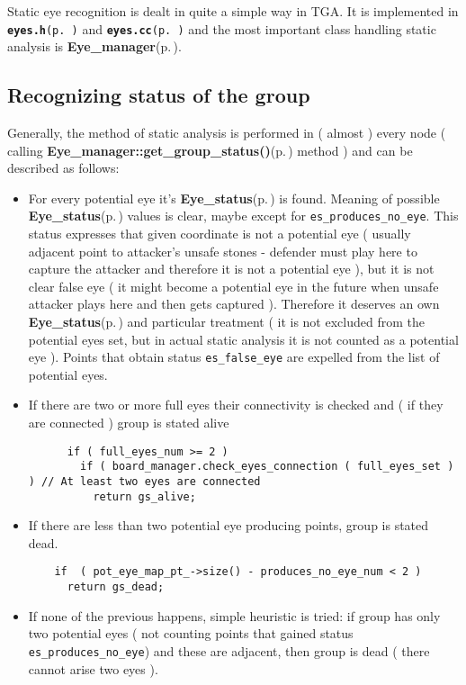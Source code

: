 Static eye recognition is dealt in quite a simple way in TGA. It is implemented in {\tt {\bf eyes.h}{\rm (p.\,\pageref{eyes_8h})}} and {\tt {\bf eyes.cc}{\rm (p.\,\pageref{eyes_8cc})}} and the most important class handling static analysis is {\bf Eye\_\-manager}{\rm (p.\,\pageref{classEye__manager})}. \subsection{Recognizing status of the group}\label{page_4_page_4__sec_1}
Generally, the method of static analysis is performed in ( almost ) every node ( calling {\bf Eye\_\-manager::get\_\-group\_\-status()}{\rm (p.\,\pageref{classEye__manager_a1})} method ) and can be described as follows:\begin{itemize}
\item For every potential eye it's {\bf Eye\_\-status}{\rm (p.\,\pageref{eyes_8h_a12})} is found. Meaning of possible {\bf Eye\_\-status}{\rm (p.\,\pageref{eyes_8h_a12})} values is clear, maybe except for {\tt es\_\-produces\_\-no\_\-eye}. This status expresses that given coordinate is not a potential eye ( usually adjacent point to attacker's unsafe stones - defender must play here to capture the attacker and therefore it is not a potential eye ), but it is not clear false eye ( it might become a potential eye in the future when unsafe attacker plays here and then gets captured ). Therefore it deserves an own {\bf Eye\_\-status}{\rm (p.\,\pageref{eyes_8h_a12})} and particular treatment ( it is not excluded from the potential eyes set, but in actual static analysis it is not counted as a potential eye ). Points that obtain status {\tt es\_\-false\_\-eye} are expelled from the list of potential eyes.\item If there are two or more full eyes their connectivity is checked and ( if they are connected ) group is stated alive 

\footnotesize\begin{verbatim}      if ( full_eyes_num >= 2 ) 
        if ( board_manager.check_eyes_connection ( full_eyes_set ) ) // At least two eyes are connected
          return gs_alive;
\end{verbatim}
\normalsize
\item If there are less than two potential eye producing points, group is stated dead. 

\footnotesize\begin{verbatim}    if  ( pot_eye_map_pt_->size() - produces_no_eye_num < 2 )  
      return gs_dead;
\end{verbatim}
\normalsize
\item If none of the previous happens, simple heuristic is tried: if group has only two potential eyes ( not counting points that gained status {\tt es\_\-produces\_\-no\_\-eye}) and these are adjacent, then group is dead ( there cannot arise two eyes ). 


\end{itemize}

